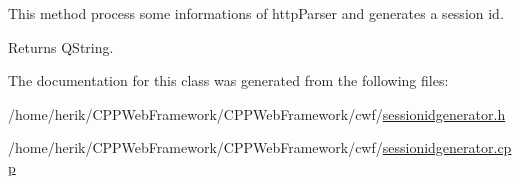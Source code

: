 This method process some informations of http\+Parser and generates a session id. 

\begin{DoxyReturn}{Returns}
Q\+String. 
\end{DoxyReturn}


The documentation for this class was generated from the following files\+:\begin{DoxyCompactItemize}
\item 
/home/herik/\+C\+P\+P\+Web\+Framework/\+C\+P\+P\+Web\+Framework/cwf/\hyperlink{sessionidgenerator_8h}{sessionidgenerator.\+h}\item 
/home/herik/\+C\+P\+P\+Web\+Framework/\+C\+P\+P\+Web\+Framework/cwf/\hyperlink{sessionidgenerator_8cpp}{sessionidgenerator.\+cpp}\end{DoxyCompactItemize}
